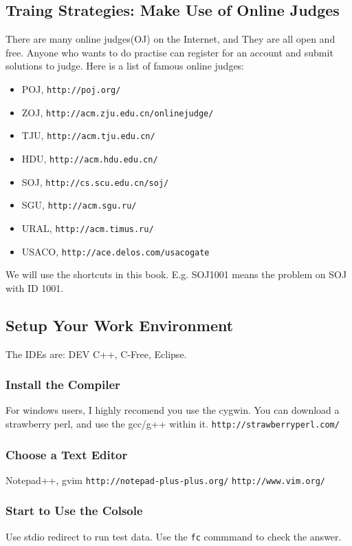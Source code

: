 \subsection{Traing Strategies: Make Use of Online Judges}
There are many online judges(OJ) on the Internet, and They are all open and free.
Anyone who wants to do practise can register for an account and submit solutions to judge.
Here is a list of famous online judges:
\begin{itemize}
	\item POJ, \verb|http://poj.org/|
	\item ZOJ, \verb|http://acm.zju.edu.cn/onlinejudge/|
	\item TJU, \verb|http://acm.tju.edu.cn/|
	\item HDU, \verb|http://acm.hdu.edu.cn/|
	\item SOJ, \verb|http://cs.scu.edu.cn/soj/|
	\item SGU, \verb|http://acm.sgu.ru/|
	\item URAL, \verb|http://acm.timus.ru/|
	\item USACO, \verb|http://ace.delos.com/usacogate|
\end{itemize}
We will use the shortcuts in this book.
E.g. SOJ1001 means the problem on SOJ with ID 1001.

\subsection{Setup Your Work Environment}
The IDEs are: DEV C++, C-Free, Eclipse.

\subsubsection{Install the Compiler}
For windows users, I highly recomend you use the cygwin.
You can download a strawberry perl, and use the gcc/g++ within it.
\verb|http://strawberryperl.com/|

\subsubsection{Choose a Text Editor}
Notepad++, gvim
\verb|http://notepad-plus-plus.org/|
\verb|http://www.vim.org/|

\subsubsection{Start to Use the Colsole}
Use stdio redirect to run test data.
Use the \verb|fc| commmand to check the answer.


